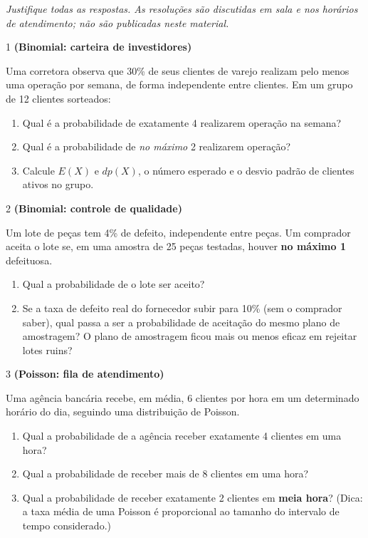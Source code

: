 \documentclass[11pt]{article}
\begin{document}

\noindent \textit{Justifique todas as respostas. As resoluções são discutidas em sala e nos horários de atendimento; não são publicadas neste material.}

\begin{questao}{1} \textbf{(Binomial: carteira de investidores)}

Uma corretora observa que 30\% de seus clientes de varejo realizam pelo menos uma operação por
semana, de forma independente entre clientes. Em um grupo de 12 clientes sorteados:

\begin{enumerate}[label=(\alph*)]
  \item Qual é a probabilidade de exatamente 4 realizarem operação na semana?
  \item Qual é a probabilidade de \emph{no máximo} 2 realizarem operação?
  \item Calcule $E(X)$ e $dp(X)$, o número esperado e o desvio padrão de clientes ativos no grupo.
\end{enumerate}
\end{questao}

\begin{questao}{2} \textbf{(Binomial: controle de qualidade)}

Um lote de peças tem 4\% de defeito, independente entre peças. Um comprador aceita o lote se, em
uma amostra de 25 peças testadas, houver \textbf{no máximo 1} defeituosa.

\begin{enumerate}[label=(\alph*)]
  \item Qual a probabilidade de o lote ser aceito?
  \item Se a taxa de defeito real do fornecedor subir para 10\% (sem o comprador saber), qual
    passa a ser a probabilidade de aceitação do mesmo plano de amostragem? O plano de amostragem
    ficou mais ou menos eficaz em rejeitar lotes ruins?
\end{enumerate}
\end{questao}

\begin{questao}{3} \textbf{(Poisson: fila de atendimento)}

Uma agência bancária recebe, em média, 6 clientes por hora em um determinado horário do dia,
seguindo uma distribuição de Poisson.

\begin{enumerate}[label=(\alph*)]
  \item Qual a probabilidade de a agência receber exatamente 4 clientes em uma hora?
  \item Qual a probabilidade de receber mais de 8 clientes em uma hora?
  \item Qual a probabilidade de receber exatamente 2 clientes em \textbf{meia hora}? (Dica: a taxa média
    de uma Poisson é proporcional ao tamanho do intervalo de tempo considerado.)
\end{enumerate}
\end{questao}
\end{document}
